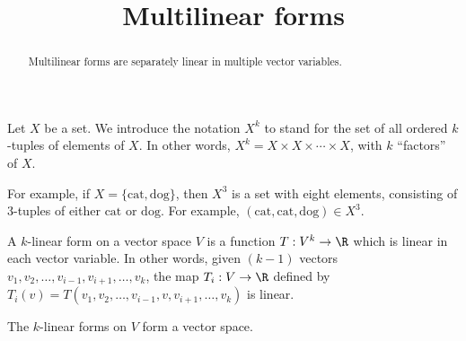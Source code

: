 \documentclass{ximera}
\title{Multilinear forms}
\begin{document}
\begin{abstract}
  Multilinear forms are separately linear in multiple vector variables.
\end{abstract}\maketitle
	
\begin{definition}
  Let $X$ be a set.  We introduce the notation $X^k$ to stand for the set of all ordered $k$-tuples of elements of $X$.  In other words, $X^k = X \times X \times \cdots \times X$, 
  with $k$ ``factors'' of $X$.
\end{definition}	

For example, if $X = \{ \text{cat}, \text{dog} \}$, then $X^3$ is a
set with eight elements, consisting of $3$-tuples of either
$\text{cat}$ or $\text{dog}$.  For example,
$(\text{cat},\text{cat},\text{dog}) \in X^3$.
	
\begin{definition}
  A $k$-linear  form on a vector space $V$ is a function $T: V^k \to \R$ which is linear in each vector variable.  In other words, given $(k-1)$ vectors
  $v_1,v_2, \ldots ,v_{i-1},v_{i+1}, \ldots ,v_k$, the map $T_i: V \to \R$ defined by $T_i(v) = T(v_1,v_2, \ldots ,v_{i-1},v,v_{i+1}, \ldots ,v_k)$ is linear.
\end{definition}

The $k$-linear forms on $V$ form a vector space.
\end{document}
